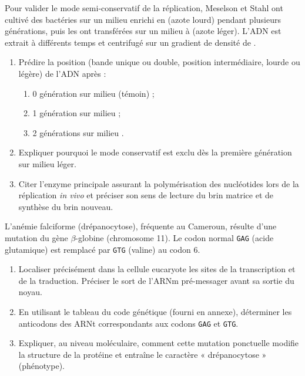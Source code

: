 \documentclass[11pt]{article}
\begin{document}
\begin{exercice}
Pour valider le mode semi-conservatif de la réplication, Meselson et Stahl ont cultivé des bactéries  sur un milieu enrichi en  (azote lourd) pendant plusieurs générations, puis les ont transférées sur un milieu à  (azote léger). L'ADN est extrait à différents temps et centrifugé sur un gradient de densité de .
\begin{enumerate}
    \item Prédire la position (bande unique ou double, position intermédiaire, lourde ou légère) de l'ADN après : 
    \begin{enumerate}
        \item 0 génération sur milieu  (témoin) ;
        \item 1 génération sur milieu  ;
        \item 2 générations sur milieu .
    \end{enumerate}
    \item Expliquer pourquoi le mode conservatif est exclu dès la première génération sur milieu léger.
    \item Citer l'enzyme principale assurant la polymérisation des nucléotides lors de la réplication \textit{in vivo} et préciser son sens de lecture du brin matrice et de synthèse du brin nouveau.
\end{enumerate}
\end{exercice}

\begin{exercice}
L'anémie falciforme (drépanocytose), fréquente au Cameroun, résulte d'une mutation du gène $\beta$-globine (chromosome 11). Le codon normal \texttt{GAG} (acide glutamique) est remplacé par \texttt{GTG} (valine) au codon 6.
\begin{enumerate}
    \item Localiser précisément dans la cellule eucaryote les sites de la transcription et de la traduction. Préciser le sort de l'ARNm pré-messager avant sa sortie du noyau.
    \item En utilisant le tableau du code génétique (fourni en annexe), déterminer les anticodons des ARNt correspondants aux codons \texttt{GAG} et \texttt{GTG}.
    \item Expliquer, au niveau moléculaire, comment cette mutation ponctuelle modifie la structure de la protéine et entraîne le caractère « drépanocytose » (phénotype).
\end{enumerate}
\end{exercice}
\end{document}
